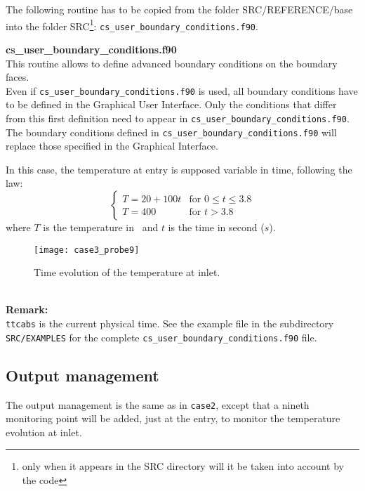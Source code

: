 The following routine has to be copied from the folder SRC/REFERENCE/base into the
folder SRC\footnote{only when it appears in the SRC directory will it be
taken into account by the code}: \texttt{cs\_user\_boundary\_conditions.f90}.

{\bfseries cs\_user\_boundary\_conditions.f90}\\
This routine allows to define advanced boundary conditions on the boundary
faces.\\
 Even if \texttt{cs\_user\_boundary\_conditions.f90} is used, all boundary conditions have to be defined in
the Graphical User Interface. Only the conditions that differ from this first
definition need to appear in \texttt{cs\_user\_boundary\_conditions.f90}. The boundary conditions
defined in \texttt{cs\_user\_boundary\_conditions.f90}
will replace those specified in the Graphical Interface.

In this case, the temperature at entry is supposed variable in time, following
the law:
\begin{equation}
\left\{\begin{array}{ll}
T = 20 + 100t & \text{for }0\leqslant t \leqslant 3.8\\
T = 400 & \text{for } t > 3.8
\end{array}\right.
\end{equation}
where $T$ is the temperature in \degresC\ and $t$ is the time in second ($s$).
\vspace{-0.1in}
\begin{figure}[h!]
\begin{center}
\texttt{[image: case3\_probe9]}
\caption{Time evolution of the temperature at inlet.}
\label{figp9_e3}
\end{center}
\end{figure}
~\\
\textbf{Remark:}\\
\texttt{ttcabs} is the current physical time. See the example file in the subdirectory
\texttt{SRC/EXAMPLES} for the complete \texttt{cs\_user\_boundary\_conditions.f90} file.

        \subsection{Output management}

The output management is the same as in \texttt{case2}, except that a nineth monitoring
point will be added, just at the entry, to monitor the temperature evolution at inlet.

